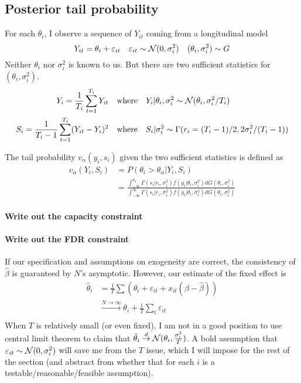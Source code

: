 \documentclass[12pt]{article}
\begin{document}
\subsection{Posterior tail probability}
For each $\theta_i$, I observe a sequence of $Y_{it}$ coming from a
longitudinal model
\begin{equation*}
    Y_{it} = \theta_i + \varepsilon_{it} \quad \varepsilon_{it} \sim \mathcal{N}(0,\sigma_i^2) \quad (\theta_i,\sigma_i^2) \sim G
\end{equation*}
Neither $\theta_i$ nor $\sigma_i^2$ is known to us. But there are two sufficient statistics for $(\theta_i,\sigma_i^2)$.
\begin{align*}
    Y_i=\frac{1}{T_i}\sum_{t=1}^{T_i}Y_{it}           & \quad \text{where}\quad Y_i|\theta_i,\sigma_i^2 \sim \mathcal{N}(\theta_i,\sigma_i^2/T_i)     \\
    S_i=\frac{1}{T_i-1}\sum_{t=1}^{T_i}(Y_{it}-Y_i)^2 & \quad \text{where} \quad S_i|\sigma_i^2 \sim \Gamma(r_i= (T_i-1)/2,2\sigma_i^2/(T_i-1)) \\
\end{align*}

The tail probability $v_\alpha(y_i,s_i)$ given the two sufficient statistics is
defined as
\begin{align*}
    v_\alpha(Y_i,S_i) & = P( \theta_i > \theta_{\alpha} | Y_i,S_i)                                                                                 \\
                      & = \frac{{\int_{-\infty}^{\theta_{\alpha}} \Gamma(s_i|r_i,\sigma_i^2) f(y_i|\theta_i, \sigma_i^2) dG(\theta_i,\sigma_i^2)}}
    {{\int_{-\infty}^{\infty} \Gamma(s_i|r_i,\sigma_i^2) f(y_i|\theta_i, \sigma_i^2) dG(\theta_i,\sigma_i^2)}}
\end{align*}

\paragraph{Write out the capacity constraint}
\paragraph{Write out the FDR constraint}

If our specification and assumptions on exogeneity are correct, the consistency
of $\hat{\beta}$ is guaranteed by $N$'s asymptotic. However, our estimate of
the fixed effect is
\begin{align*}
    \hat{\theta}_i & =\frac{1}{T}\sum(\theta_i+\varepsilon_{it}+x_{it}(\beta-\hat{\beta}))              \\
                   & \overset{N\to \infty}{\longrightarrow} \theta_i+\frac{1}{T}\sum_t \varepsilon_{it} \\
\end{align*}
When $T$ is relatively small (or even fixed), I am not in a good position to use central limit theorem to claim that $\hat{\theta}_i \overset{d}{\to} \mathcal{N}(\theta_i,\frac{\sigma_i^2}{T})$. A bold assumption that $\varepsilon_{it} \sim \mathcal{N}(0,\sigma_i^2)$ will save me from the $T$ issue, which I will impose for the rest of the section (and abstract from whether that  for each $i$ is a testable/reasonable/feasible assumption).
\end{document}

